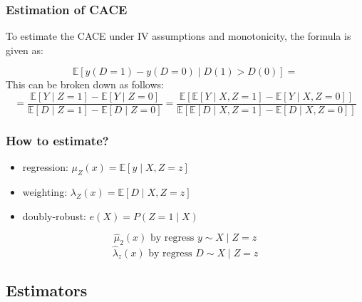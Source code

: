 \subsubsection{Estimation of CACE}
To estimate the CACE under IV assumptions and monotonicity, the formula is given as:


\[
\mathbb{E}\left[ y(D=1) - y(D=0) \mid D(1) > D(0) \right] =
\]
This can be broken down as follows: 
\[
= \frac{\mathbb{E}[Y \mid Z=1] - \mathbb{E}[Y \mid Z=0]}{\mathbb{E}[D \mid Z=1] - \mathbb{E}[D \mid Z=0]}=  \frac{\mathbb{E}\left[ \mathbb{E}[Y \mid X, Z=1] - \mathbb{E}[Y \mid X, Z=0] \right]} {\mathbb{E}\left[ \mathbb{E}[D \mid X, Z=1] - \mathbb{E}[D \mid X, Z=0] \right]}
\]

\subsubsection{How to estimate?}
\begin{itemize}
    \item regression: $\mu_Z(x) = \mathbb{E}[y \mid X, Z=z]$
    \item weighting: $\lambda_Z(x) = \mathbb{E}[D \mid X, Z=z]$
    \item doubly-robust: $e(X) = P(Z=1 \mid X)$
\end{itemize}

\[
\hat{\mu}_2(x) \text{ by regress } y \sim X \mid Z=z
\]
\[
\hat{\lambda}_z(x) \text{ by regress } D \sim X \mid Z=z
\]

\subsection{Estimators}

